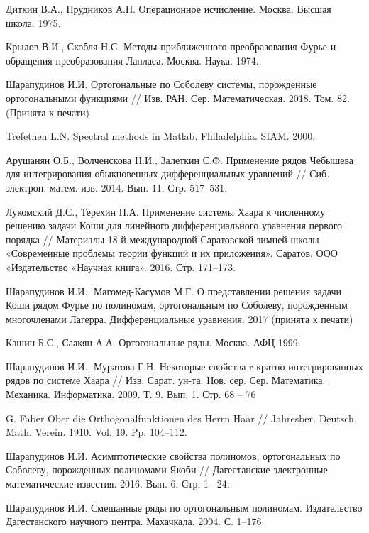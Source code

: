 \begin{thebibliography}{111}
{Диткин В.А., Прудников А.П.}
Операционное исчисление. Москва. Высшая школа. 1975.


{Крылов В.И., Скобля Н.С.}
Методы приближенного преобразования Фурье и обращения преобразования Лапласа. Москва. Наука. 1974.


Шарапудинов И.И. Ортогональные  по Соболеву системы, порожденные ортогональными функциями // Изв. РАН. Сер. Математическая. 2018. Том. 82. (Принята к печати)


{Trefethen  L.N.}
Spectral methods in Matlab. Fhiladelphia. SIAM. 2000.


{Арушанян О.Б., Волченскова Н.И., Залеткин С.Ф.}
Применение рядов Чебышева для интегрирования обыкновенных дифференциальных уравнений // Сиб. электрон. матем. изв. 2014. Вып. 11. Стр. 517--531.


{Лукомский Д.С., Терехин П.А.}
Применение системы Хаара к численному решению задачи Коши для линейного дифференциального уравнения первого порядка // Материалы 18-й международной Саратовской зимней школы «Современные проблемы теории функций и их приложения». Саратов. ООО «Издательство «Научная книга». 2016. Стр. 171--173.


{Шарапудинов И.И., Магомед-Касумов М.Г.}
О представлении решения задачи Коши  рядом Фурье  по полиномам, ортогональным по  Соболеву, порожденным многочленами Лагерра. Дифференциальные уравнения. 2017 (принята к печати)


{Кашин Б.С., Саакян А.А.}
Ортогональные ряды. Москва. АФЦ 1999.


{Шарапудинов И.И., Муратова Г.Н.}
Некоторые свойства r-кратно интегрированных рядов по системе Хаара // Изв. Сарат. ун-та. Нов. сер. Сер. Математика. Механика. Информатика. 2009. Т. 9. Вып. 1. Стр. 68 -- 76


{G. Faber}
Ober die Orthogonalfunktionen des Herrn Haar // Jahresber. Deutsch. Math. Verein. 1910. Vol. 19. Pp. 104--112.


{Шарапудинов И.И.}
Асимптотические свойства полиномов, ортогональных по Соболеву, порожденных полиномами Якоби // Дагестанские электронные математические известия. 2016. Вып. 6.	Стр. 1–-24.


{Шарапудинов И.И.}
Смешанные ряды по ортогональным полиномам. Издательство Дагестанского научного центра. Махачкала. 2004. С. 1--176.



\end{thebibliography}
